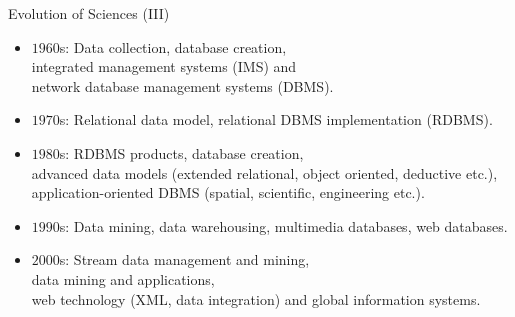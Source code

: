\begin{frame}{Evolution of Sciences (III)}
	\begin{itemize}
		\item $1960$s: Data collection, database creation, \\
		\hspace{1cm} integrated management systems (IMS) and \\
		\hspace{1cm} network database management systems (DBMS).
		\item $1970$s: Relational data model, relational DBMS implementation 
		(RDBMS).
		\item $1980$s: RDBMS products, database creation, \\
		\hspace{1cm} advanced data models (extended relational, object 
		oriented, deductive etc.),\\
		\hspace{1cm} application-oriented DBMS (spatial, scientific, 
		engineering etc.).
		\item $1990$s: Data mining, data warehousing, multimedia databases, web 
		databases.
		\item $2000$s: Stream data management and mining,\\
		\hspace{1cm} data mining and applications, \\
		\hspace{1cm} web technology (XML, data integration) and global 
		information systems.
	\end{itemize}
\end{frame}